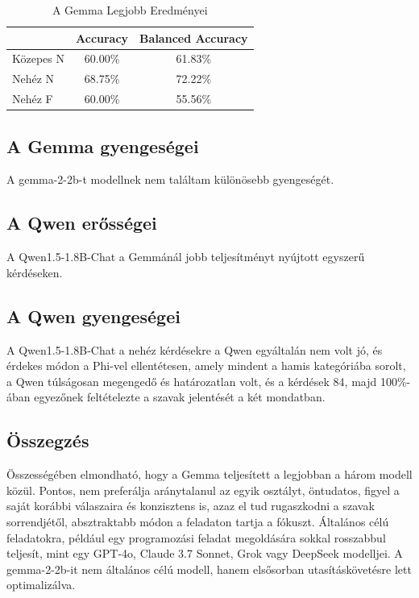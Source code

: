 \documentclass[12pt]{report}
\theoremstyle{definition}
\begin{document}
\begin{table}[h]
    \centering
    \begin{tabular}{lcc}
        \hline
        & \textbf{Accuracy} & \textbf{Balanced Accuracy} \\
        \hline
        Közepes N & 60.00\% & 61.83\% \\
        Nehéz N & 68.75\% & 72.22\% \\
        Nehéz F & 60.00\% & 55.56\% \\
        \hline
    \end{tabular}
    \caption{A Gemma Legjobb Eredményei}
    \label{tab:accuracy_balanced_accuracy2}
\end{table}


\subsection{A Gemma gyengeségei}
A gemma-2-2b-t modellnek nem találtam különösebb gyengeségét.

\subsection{A Qwen erősségei}
A Qwen1.5-1.8B-Chat a Gemmánál jobb teljesítményt nyújtott egyszerű kérdéseken.

\subsection{A Qwen gyengeségei}
A Qwen1.5-1.8B-Chat a nehéz kérdésekre a Qwen egyáltalán nem volt jó, és érdekes módon a Phi-vel ellentétesen, amely mindent a hamis kategóriába sorolt, a Qwen túlságosan megengedő és határozatlan volt, és a kérdések 84, majd 100\%-ában egyezőnek feltételezte a szavak jelentését a két mondatban.


\subsection{Összegzés}
Összességében elmondható, hogy a Gemma teljesített a legjobban a három modell közül. Pontos, nem preferálja aránytalanul az egyik osztályt, öntudatos, figyel a saját korábbi válaszaira és konzisztens is, azaz el tud rugaszkodni a szavak sorrendjétől, absztraktabb módon a feladaton tartja a fókuszt. Általános célú feladatokra, például egy programozási feladat megoldására sokkal rosszabbul teljesít, mint egy GPT-4o, Claude 3.7 Sonnet, Grok vagy DeepSeek modelljei. A gemma-2-2b-it nem általános célú modell, hanem elsősorban utasításkövetésre lett optimalizálva.
\end{document}
